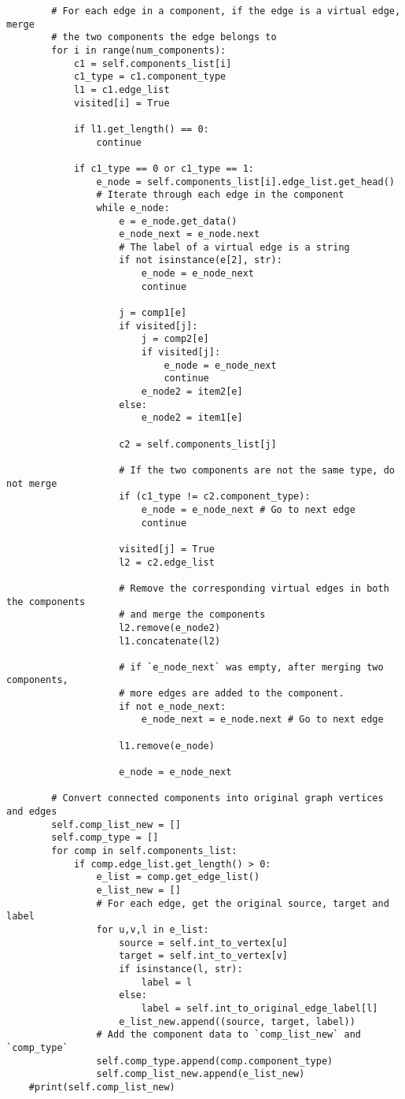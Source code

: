 \begin{center}
\begin{verbatim}
		# For each edge in a component, if the edge is a virtual edge, merge
		# the two components the edge belongs to
		for i in range(num_components):
			c1 = self.components_list[i]
			c1_type = c1.component_type
			l1 = c1.edge_list
			visited[i] = True

			if l1.get_length() == 0:
				continue

			if c1_type == 0 or c1_type == 1:
				e_node = self.components_list[i].edge_list.get_head()
				# Iterate through each edge in the component
				while e_node:
					e = e_node.get_data()
					e_node_next = e_node.next
					# The label of a virtual edge is a string
					if not isinstance(e[2], str):
						e_node = e_node_next
						continue

					j = comp1[e]
					if visited[j]:
						j = comp2[e]
						if visited[j]:
							e_node = e_node_next
							continue
						e_node2 = item2[e]
					else:
						e_node2 = item1[e]

					c2 = self.components_list[j]

					# If the two components are not the same type, do not merge
					if (c1_type != c2.component_type):
						e_node = e_node_next # Go to next edge
						continue

					visited[j] = True
					l2 = c2.edge_list

					# Remove the corresponding virtual edges in both the components
					# and merge the components
					l2.remove(e_node2)
					l1.concatenate(l2)

					# if `e_node_next` was empty, after merging two components,
					# more edges are added to the component.
					if not e_node_next:
						e_node_next = e_node.next # Go to next edge

					l1.remove(e_node)

					e_node = e_node_next

		# Convert connected components into original graph vertices and edges
		self.comp_list_new = []
		self.comp_type = []
		for comp in self.components_list:
			if comp.edge_list.get_length() > 0:
				e_list = comp.get_edge_list()
				e_list_new = []
				# For each edge, get the original source, target and label
				for u,v,l in e_list:
					source = self.int_to_vertex[u]
					target = self.int_to_vertex[v]
					if isinstance(l, str):
						label = l
					else:
						label = self.int_to_original_edge_label[l]
					e_list_new.append((source, target, label))
				# Add the component data to `comp_list_new` and `comp_type`
				self.comp_type.append(comp.component_type)
				self.comp_list_new.append(e_list_new)
	#print(self.comp_list_new)


\end{verbatim}
\end{center}
